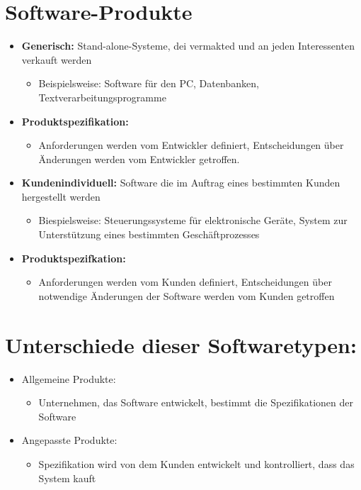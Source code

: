 \section{Software-Produkte}
\begin{itemize}
    \item \textbf{Generisch:} Stand-alone-Systeme, dei vermakted und an jeden Interessenten verkauft werden
    \begin{itemize}
        \item Beispielsweise: Software für den PC, Datenbanken, Textverarbeitungsprogramme
    \end{itemize}
    \item \textbf{Produktspezifikation:}
    \begin{itemize}
        \item Anforderungen werden vom Entwickler definiert, Entscheidungen über Änderungen werden vom Entwickler getroffen.
    \end{itemize}
    \item \textbf{Kundenindividuell:} Software die im Auftrag eines bestimmten Kunden hergestellt werden
    \begin{itemize}
        \item Biespielsweise: Steuerungssysteme für elektronische Geräte, System zur Unterstützung eines bestimmten Geschäftprozesses
    \end{itemize}
    \item \textbf{Produktspezifkation:}
    \begin{itemize}
        \item Anforderungen werden vom Kunden definiert, Entscheidungen über notwendige Änderungen der Software werden vom Kunden getroffen
    \end{itemize}
\end{itemize}

\section{Unterschiede dieser Softwaretypen:}
\begin{itemize}
    \item Allgemeine Produkte:
    \begin{itemize}
        \item Unternehmen, das Software entwickelt, bestimmt die Spezifikationen der Software
    \end{itemize}
    \item Angepasste Produkte:
    \begin{itemize}
        \item Spezifikation wird von dem Kunden entwickelt und kontrolliert, dass das System kauft
    \end{itemize}
\end{itemize}

